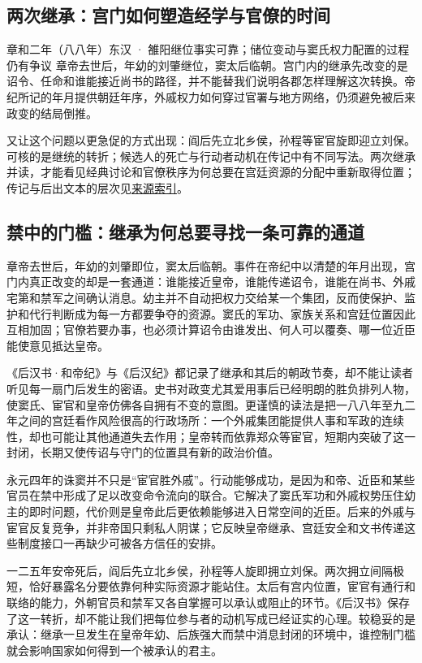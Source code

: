 \subsection{两次继承：宫门如何塑造经学与官僚的时间}
\begin{event}{}{章和二年（八八年）}{东汉 · 雒阳}{继位事实可靠；储位变动与窦氏权力配置的过程仍有争议}
章帝去世后，年幼的刘肇继位，窦太后临朝。宫门内的继承先改变的是诏令、任命和谁能接近尚书的路径，并不能替我们说明各郡怎样理解这次转换。帝纪所记的年月提供朝廷年序，外戚权力如何穿过官署与地方网络，仍须避免被后来政变的结局倒推。

又让这个问题以更急促的方式出现：阎后先立北乡侯，孙程等宦官旋即迎立刘保。可核的是继统的转折；候选人的死亡与行动者动机在传记中有不同写法。两次继承并读，才能看见经典讨论和官僚秩序为何总要在宫廷资源的分配中重新取得位置；传记与后出文本的层次见\hyperref[app:sources]{来源索引}。
\end{event}
\subsection{禁中的门槛：继承为何总要寻找一条可靠的通道}

章帝去世后，年幼的刘肇即位，窦太后临朝。事件在帝纪中以清楚的年月出现，宫门内真正改变的却是一套通道：谁能接近皇帝，谁能传递诏令，谁能在尚书、外戚宅第和禁军之间确认消息。幼主并不自动把权力交给某一个集团，反而使保护、监护和代行判断成为每一方都要争夺的资源。窦氏的军功、家族关系和宫廷位置因此互相加固；官僚若要办事，也必须计算诏令由谁发出、何人可以覆奏、哪一位近臣能使意见抵达皇帝。

《后汉书·和帝纪》与《后汉纪》都记录了继承和其后的朝政节奏，却不能让读者听见每一扇门后发生的密语。史书对政变尤其爱用事后已经明朗的胜负排列人物，使窦氏、宦官和皇帝仿佛各自拥有不变的意图。更谨慎的读法是把一八八年至九二年之间的宫廷看作风险很高的行政场所：一个外戚集团能提供人事和军政的连续性，却也可能让其他通道失去作用；皇帝转而依靠郑众等宦官，短期内突破了这一封闭，长期又使传诏与守门的位置具有新的政治价值。

永元四年的诛窦并不只是“宦官胜外戚”。行动能够成功，是因为和帝、近臣和某些官员在禁中形成了足以改变命令流向的联合。它解决了窦氏军功和外戚权势压住幼主的即时问题，代价则是皇帝此后更依赖能够进入日常空间的近臣。后来的外戚与宦官反复竞争，并非帝国只剩私人阴谋；它反映皇帝继承、宫廷安全和文书传递这些制度接口一再缺少可被各方信任的安排。

一二五年安帝死后，阎后先立北乡侯，孙程等人旋即拥立刘保。两次拥立间隔极短，恰好暴露名分要依靠何种实际资源才能站住。太后有宫内位置，宦官有通行和联络的能力，外朝官员和禁军又各自掌握可以承认或阻止的环节。《后汉书》保存了这一转折，却不能让我们把每位参与者的动机写成已经证实的心理。较稳妥的是承认：继承一旦发生在皇帝年幼、后族强大而禁中消息封闭的环境中，谁控制门槛就会影响国家如何得到一个被承认的君主。

